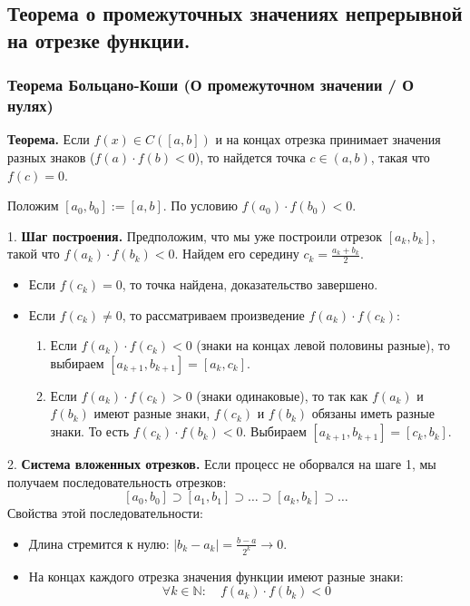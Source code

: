 \subsection{Теорема о промежуточных значениях непрерывной на отрезке функции.}

\subsubsection*{Теорема Больцано-Коши (О промежуточном значении / О нулях)}
\textbf{Теорема.} Если $f(x) \in C([a, b])$ и на концах отрезка принимает значения разных знаков ($f(a) \cdot f(b) < 0$), то найдется точка $c \in (a, b)$, такая что $f(c) = 0$.

\begin{tcolorbox}[title=Доказательство (Метод деления отрезка пополам)]
	Положим $[a_0, b_0] := [a, b]$. По условию $f(a_0) \cdot f(b_0) < 0$.

	1. \textbf{Шаг построения.}
	Предположим, что мы уже построили отрезок $[a_k, b_k]$, такой что $f(a_k) \cdot f(b_k) < 0$.
	Найдем его середину $c_k = \frac{a_k + b_k}{2}$.
	\begin{itemize}
		\item Если $f(c_k) = 0$, то точка найдена, доказательство завершено.
		\item Если $f(c_k) \neq 0$, то рассматриваем произведение $f(a_k) \cdot f(c_k)$:
		\begin{enumerate}
			\item Если $f(a_k) \cdot f(c_k) < 0$ (знаки на концах левой половины разные), то выбираем $[a_{k+1}, b_{k+1}] = [a_k, c_k]$.
			\item Если $f(a_k) \cdot f(c_k) > 0$ (знаки одинаковые), то так как $f(a_k)$ и $f(b_k)$ имеют разные знаки, $f(c_k)$ и $f(b_k)$ обязаны иметь разные знаки. То есть $f(c_k) \cdot f(b_k) < 0$. Выбираем $[a_{k+1}, b_{k+1}] = [c_k, b_k]$.
		\end{enumerate}
	\end{itemize}

	2. \textbf{Система вложенных отрезков.}
	Если процесс не оборвался на шаге 1, мы получаем последовательность отрезков:
	\[ [a_0, b_0] \supset [a_1, b_1] \supset \dots \supset [a_k, b_k] \supset \dots \]
	Свойства этой последовательности:
	\begin{itemize}
		\item Длина стремится к нулю: $|b_k - a_k| = \frac{b-a}{2^k} \to 0$.
		\item На концах каждого отрезка значения функции имеют разные знаки:
		\[ \forall k \in \mathbb{N}: \quad f(a_k) \cdot f(b_k) < 0 \]
	\end{itemize}
	

\end{tcolorbox}
